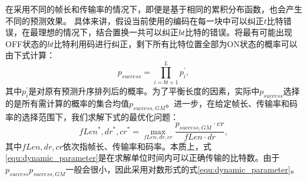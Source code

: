 在采用不同的帧长和传输率的情况下，即便是基于相同的累积分布函数，也会产生不同的预测效果。
具体来讲，假设当前使用的编码在每一块中可以纠正$t$比特错误，在最理想的情况下，结合置换一共可以纠正$bt$比特的错误。将最有可能出现OFF状态的$bt$比特利用码进行纠正，剩下所有比特位置全部为ON状态的概率可以由下式计算：
\begin{equation}
p_{success} = \prod_{i = bt+1}^{L} p_i^{'},
\end{equation}
其中$p_i^{'}$是对原有预测升序排列后的概率。为了平衡长度的因素，实际中$p_{success}$选择的是所有需计算的概率的集合均值$p_{success, GM}$。进一步，在给定帧长、传输率和码率的选择范围下，我们求解下式的最优化问题：
\begin{equation}
\label{equ:dynamic_parameter}
fLen^\ast, dr^\ast, cr^\ast = \max_{fLen, dr, cr} \frac{p_{success, GM}\cdot cr}{fLen\cdot dr},
\end{equation}
其中$fLen,dr,cr$依次指帧长、传输率和码率。本质上，式\ref{equ:dynamic_parameter}是在求解单位时间内可以正确传输的比特数。由于$p_{success}p_{success, GM}$一般会很小，因此采用对数形式的式\ref{equ:dynamic_parameter}。